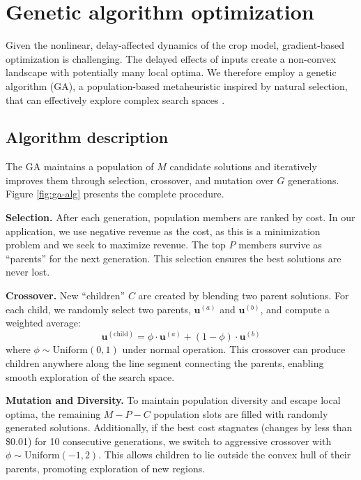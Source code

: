 \documentclass[pdflatex,sn-mathphys-num]{sn-jnl}
\begin{document}
\section{Genetic algorithm optimization}\label{sec:ga}

Given the nonlinear, delay-affected dynamics of the crop model, gradient-based optimization is challenging. The delayed effects of inputs create a non-convex landscape with potentially many local optima. We therefore employ a genetic algorithm (GA), a population-based metaheuristic inspired by natural selection, that can effectively explore complex search spaces \cite{goldberg1989ga}.

\subsection{Algorithm description}\label{subsec:ga-alg}

The GA maintains a population of $M$ candidate solutions and iteratively improves them through selection, crossover, and mutation over $G$ generations. Figure \ref{fig:ga-alg} presents the complete procedure.

\textbf{Selection.} After each generation, population members are ranked by cost. In our application, we use negative revenue as the cost, as this is a minimization problem and we seek to maximize revenue. The top $P$ members survive as ``parents'' for the next generation. This selection ensures the best solutions are never lost.

\textbf{Crossover.} New ``children'' $C$ are created by blending two parent solutions. For each child, we randomly select two parents, $\mathbf{u}^{(a)}$ and $\mathbf{u}^{(b)}$, and compute a weighted average:
\begin{equation}
\mathbf{u}^{(\text{child})} = \phi \cdot \mathbf{u}^{(a)} + (1 - \phi) \cdot \mathbf{u}^{(b)}
\label{eqn:crossover}
\end{equation}
where $\phi \sim \text{Uniform}(0, 1)$ under normal operation. This crossover can produce children anywhere along the line segment connecting the parents, enabling smooth exploration of the search space.

\textbf{Mutation and Diversity.} To maintain population diversity and escape local optima, the remaining $M - P - C$ population slots are filled with randomly generated solutions. Additionally, if the best cost stagnates (changes by less than \$0.01) for 10 consecutive generations, we switch to aggressive crossover with $\phi \sim \text{Uniform}(-1, 2)$. This allows children to lie outside the convex hull of their parents, promoting exploration of new regions.
\end{document}
